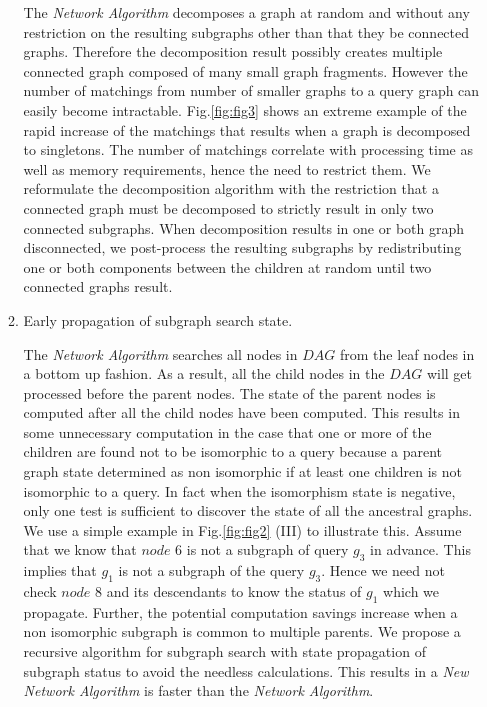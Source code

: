 \begin{enumerate}
\begin{enumerate}
The \textit{Network Algorithm} decomposes a graph at random and without any restriction on the resulting subgraphs other than that they be connected graphs.
Therefore the decomposition result possibly creates multiple connected graph composed of many small graph fragments.
However the number of matchings from number of smaller graphs to a query graph can easily become intractable.
Fig.\ref{fig:fig3} shows an extreme example of the rapid increase of the matchings that results when a graph is decomposed to singletons.
The number of matchings correlate with processing time as well as memory requirements, hence the need to restrict them. We reformulate the decomposition algorithm with the restriction that a connected graph must be decomposed to strictly result in only two connected subgraphs. When decomposition results in one or both graph disconnected, we post-process the resulting subgraphs by redistributing one or both components between the children  at random until two connected graphs result.


\item Early propagation of subgraph search state.

The \textit{Network Algorithm} searches all nodes in $DAG$ from the leaf nodes in a bottom up fashion.
As a result, all the child nodes in the $DAG$ will get processed before the parent nodes. The state of the parent nodes is computed after all the child nodes have been computed. This results in some unnecessary computation in the case that one or more of the children are found not to be isomorphic to a query because a parent graph state determined as non isomorphic if at least one children is not isomorphic to a query.  In fact when the isomorphism state is negative, only one test is sufficient to discover the state of all the ancestral graphs. We use a simple example in Fig.\ref{fig:fig2} (III) to illustrate this.
Assume that we know that $node$ 6 is not a subgraph of query $g_3$ in advance. This implies that $g_1$ is not a subgraph of the query $g_3$.
Hence we need not check $node$ 8 and its descendants to know the status of $g_1$ which we propagate. Further, the potential computation savings increase when a non isomorphic subgraph is common to multiple parents. We propose a recursive algorithm for subgraph search with state propagation of subgraph status to avoid the needless calculations. This results in a \textit{New Network Algorithm} is faster than the \textit{Network Algorithm}.
\end{enumerate}


\end{enumerate}
